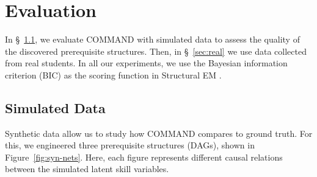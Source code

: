 \documentclass{edm_template}
\begin{document}
\section{Evaluation}
In \S~\ref{sec:synthetic}, we evaluate COMMAND with simulated data  to assess the quality of the discovered prerequisite structures.
Then, in \S~\ref{sec:real} we use  data collected from real students.
In all our experiments, we use the Bayesian information criterion (BIC) as the scoring function in Structural EM . 

	\subsection{Simulated Data}
	\label{sec:synthetic}
	
	Synthetic data allow us to study how COMMAND compares to ground truth.
	For this, we engineered three prerequisite structures (DAGs), shown in Figure~\ref{fig:syn-nets}.
	Here, each figure represents different causal relations between the simulated latent skill variables.
	
\end{document}
